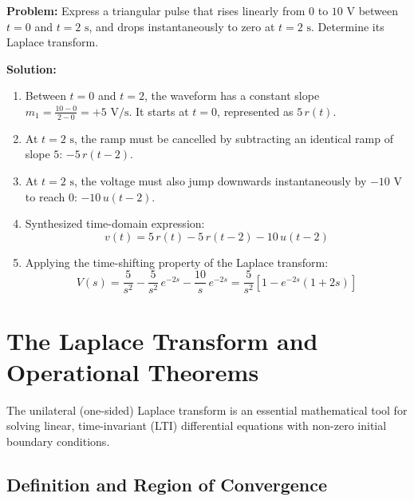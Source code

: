 \documentclass[12pt,a4paper]{article}
\begin{document}
\begin{tcolorbox}[examplebox, title={\textbf{Step-by-Step Example: Waveform Synthesis and its Transform}}]
\textbf{Problem:} Express a triangular pulse that rises linearly from $0$ to $10\text{ V}$ between $t=0$ and $t=2\text{ s}$, and drops instantaneously to zero at $t=2\text{ s}$. Determine its Laplace transform.

\textbf{Solution:}
\begin{enumerate}[leftmargin=*]
  \item Between $t=0$ and $t=2$, the waveform has a constant slope $m_1 = \frac{10 - 0}{2 - 0} = +5\text{ V/s}$. It starts at $t=0$, represented as $5\,r(t)$.
  \item At $t=2\text{ s}$, the ramp must be cancelled by subtracting an identical ramp of slope $5$: $-5\,r(t-2)$.
  \item At $t=2\text{ s}$, the voltage must also jump downwards instantaneously by $-10\text{ V}$ to reach $0$: $-10\,u(t-2)$.
  \item Synthesized time-domain expression:
  \begin{equation}
    v(t) = 5\,r(t) - 5\,r(t-2) - 10\,u(t-2)
  \end{equation}
  \item Applying the time-shifting property of the Laplace transform:
  \begin{equation}
    V(s) = \frac{5}{s^2} - \frac{5}{s^2}\,e^{-2s} - \frac{10}{s}\,e^{-2s} = \frac{5}{s^2}\left[1 - e^{-2s}(1 + 2s)\right]
  \end{equation}
\end{enumerate}
\end{tcolorbox}

\section{The Laplace Transform and Operational Theorems}

The unilateral (one-sided) Laplace transform is an essential mathematical tool for solving linear, time-invariant (LTI) differential equations with non-zero initial boundary conditions.

\subsection{Definition and Region of Convergence}
\end{document}
